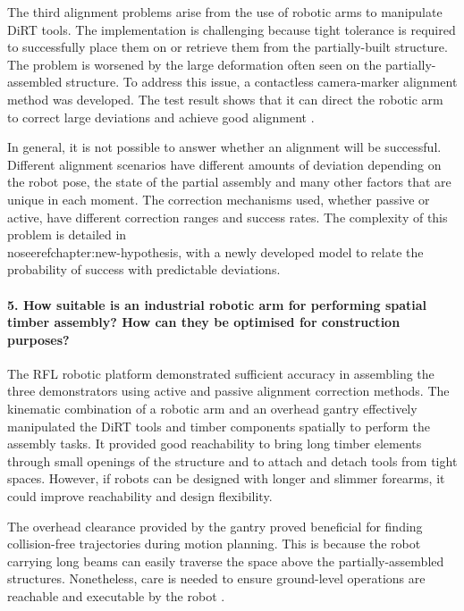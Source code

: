 The third alignment problems arise from the use of robotic arms to manipulate DiRT tools. The implementation is challenging because tight tolerance is required to successfully place them on or retrieve them from the partially-built structure. The problem is worsened by the large deformation often seen on the partially-assembled structure. To address this issue, a contactless camera-marker alignment method was developed. The test result shows that it can direct the robotic arm to correct large deviations and achieve good alignment .

In general, it is not possible to answer whether an alignment will be successful. Different alignment scenarios have different amounts of deviation depending on the robot pose, the state of the partial assembly and many other factors that are unique in each moment. The correction mechanisms used, whether passive or active, have different correction ranges and success rates. The complexity of this problem is detailed in \\noseeref{chapter:new-hypothesis}, with a newly developed model to relate the probability of success with predictable deviations.

\paragraph{5. How suitable is an industrial robotic arm for performing spatial timber assembly? How can they be optimised for construction purposes?}

The RFL robotic platform demonstrated sufficient accuracy in assembling the three demonstrators using active and passive alignment correction methods. The kinematic combination of a robotic arm and an overhead gantry effectively manipulated the DiRT tools and timber components spatially to perform the assembly tasks. It provided good reachability to bring long timber elements through small openings of the structure and to attach and detach tools from tight spaces. However, if robots can be designed with longer and slimmer forearms, it could improve reachability and design flexibility. 

The overhead clearance provided by the gantry proved beneficial for finding collision-free trajectories during motion planning. This is because the robot carrying long beams can easily traverse the space above the partially-assembled structures. Nonetheless, care is needed to ensure ground-level operations are reachable and executable by the robot .

